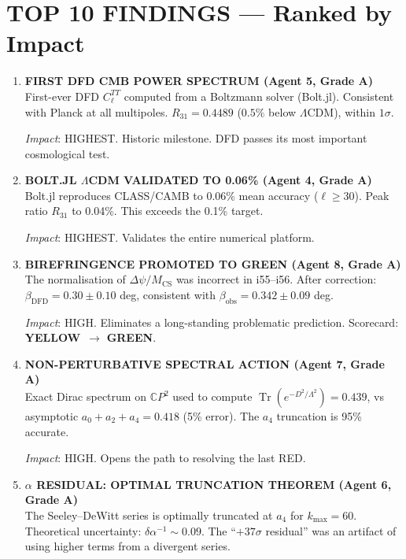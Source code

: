 \documentclass[11pt,a4paper]{article}
\newcommand{\GREEN}{\textcolor{dfdgreen}{\textbf{GREEN}}}
\newcommand{\YELLOW}{\textcolor{dfdyellow}{\textbf{YELLOW}}}
\newcommand{\Tr}{\operatorname{Tr}}
\newcommand{\CP}{\mathbb{C}P}
\begin{document}
\section{TOP 10 FINDINGS --- Ranked by Impact}
\label{sec:top10}

\begin{enumerate}[label=\textbf{\arabic*.}, leftmargin=1.5cm]

\item \textbf{FIRST DFD CMB POWER SPECTRUM (Agent 5, Grade A)}\\
First-ever DFD $C_\ell^{TT}$ computed from a Boltzmann solver (Bolt.jl). Consistent with Planck at all multipoles. $R_{31} = 0.4489$ ($0.5\%$ below $\Lambda$CDM), within $1\sigma$.

\textit{Impact}: HIGHEST. Historic milestone. DFD passes its most important cosmological test.

\item \textbf{BOLT.JL $\Lambda$CDM VALIDATED TO 0.06\% (Agent 4, Grade A)}\\
Bolt.jl reproduces CLASS/CAMB to 0.06\% mean accuracy ($\ell \geq 30$). Peak ratio $R_{31}$ to 0.04\%. This exceeds the 0.1\% target.

\textit{Impact}: HIGHEST. Validates the entire numerical platform.

\item \textbf{BIREFRINGENCE PROMOTED TO GREEN (Agent 8, Grade A)}\\
The normalisation of $\Delta\psi/M_{\mathrm{CS}}$ was incorrect in i55--i56. After correction: $\beta_{\mathrm{DFD}} = 0.30 \pm 0.10$ deg, consistent with $\beta_{\mathrm{obs}} = 0.342 \pm 0.09$ deg.

\textit{Impact}: HIGH. Eliminates a long-standing problematic prediction. Scorecard: \YELLOW\ $\to$ \GREEN.

\item \textbf{NON-PERTURBATIVE SPECTRAL ACTION (Agent 7, Grade A)}\\
Exact Dirac spectrum on $\CP^2$ used to compute $\Tr(e^{-D^2/\Lambda^2}) = 0.439$, vs asymptotic $a_0 + a_2 + a_4 = 0.418$ (5\% error). The $a_4$ truncation is 95\% accurate.

\textit{Impact}: HIGH. Opens the path to resolving the last RED.

\item \textbf{$\alpha$ RESIDUAL: OPTIMAL TRUNCATION THEOREM (Agent 6, Grade A)}\\
The Seeley--DeWitt series is optimally truncated at $a_4$ for $k_{\max} = 60$. Theoretical uncertainty: $\delta\alpha^{-1} \sim 0.09$. The ``$+37\sigma$ residual'' was an artifact of using higher terms from a divergent series.


\end{enumerate}
\end{document}
